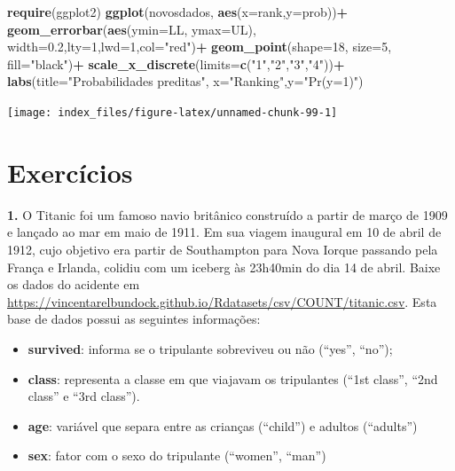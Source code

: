 \documentclass[12pt,brazil,oneside]{book}
\newenvironment{Shaded}{\begin{snugshade}}{\end{snugshade}}
\newcommand{\DataTypeTok}[1]{\textcolor[rgb]{0.13,0.29,0.53}{#1}}
\newcommand{\DecValTok}[1]{\textcolor[rgb]{0.00,0.00,0.81}{#1}}
\newcommand{\FloatTok}[1]{\textcolor[rgb]{0.00,0.00,0.81}{#1}}
\newcommand{\KeywordTok}[1]{\textcolor[rgb]{0.13,0.29,0.53}{\textbf{#1}}}
\newcommand{\NormalTok}[1]{#1}
\newcommand{\OperatorTok}[1]{\textcolor[rgb]{0.81,0.36,0.00}{\textbf{#1}}}
\newcommand{\StringTok}[1]{\textcolor[rgb]{0.31,0.60,0.02}{#1}}
\providecommand{\tightlist}{%
  \setlength{\itemsep}{0pt}\setlength{\parskip}{0pt}}
\begin{document}
\begin{Shaded}
\begin{Highlighting}[]
\KeywordTok{require}\NormalTok{(ggplot2)}
\KeywordTok{ggplot}\NormalTok{(novosdados, }\KeywordTok{aes}\NormalTok{(}\DataTypeTok{x=}\NormalTok{rank,}\DataTypeTok{y=}\NormalTok{prob))}\OperatorTok{+}
\StringTok{  }\KeywordTok{geom_errorbar}\NormalTok{(}\KeywordTok{aes}\NormalTok{(}\DataTypeTok{ymin=}\NormalTok{LL, }\DataTypeTok{ymax=}\NormalTok{UL), }\DataTypeTok{width=}\FloatTok{0.2}\NormalTok{,}\DataTypeTok{lty=}\DecValTok{1}\NormalTok{,}\DataTypeTok{lwd=}\DecValTok{1}\NormalTok{,}\DataTypeTok{col=}\StringTok{"red"}\NormalTok{)}\OperatorTok{+}
\StringTok{  }\KeywordTok{geom_point}\NormalTok{(}\DataTypeTok{shape=}\DecValTok{18}\NormalTok{, }\DataTypeTok{size=}\DecValTok{5}\NormalTok{, }\DataTypeTok{fill=}\StringTok{"black"}\NormalTok{)}\OperatorTok{+}
\StringTok{  }\KeywordTok{scale_x_discrete}\NormalTok{(}\DataTypeTok{limits=}\KeywordTok{c}\NormalTok{(}\StringTok{"1"}\NormalTok{,}\StringTok{"2"}\NormalTok{,}\StringTok{"3"}\NormalTok{,}\StringTok{"4"}\NormalTok{))}\OperatorTok{+}
\StringTok{  }\KeywordTok{labs}\NormalTok{(}\DataTypeTok{title=}\StringTok{"Probabilidades preditas"}\NormalTok{, }\DataTypeTok{x=}\StringTok{"Ranking"}\NormalTok{,}\DataTypeTok{y=}\StringTok{"Pr(y=1)"}\NormalTok{)}
\end{Highlighting}
\end{Shaded}

\begin{center}\texttt{[image: index\_files/figure-latex/unnamed-chunk-99-1]} \end{center}

\hypertarget{exercicios}{%
\section{Exercícios}\label{exercicios}}

\textbf{1.} O Titanic foi um famoso navio britânico construído a partir de março de 1909 e lançado ao mar em maio de 1911. Em sua viagem inaugural em 10 de abril de 1912, cujo objetivo era partir de Southampton para Nova Iorque passando pela França e Irlanda, colidiu com um iceberg às 23h40min do dia 14 de abril. Baixe os dados do acidente em
\url{https://vincentarelbundock.github.io/Rdatasets/csv/COUNT/titanic.csv}. Esta base de dados possui as seguintes informações:

\begin{itemize}
\tightlist
\item
  \textbf{survived}: informa se o tripulante sobreviveu ou não (``yes'', ``no'');
\item
  \textbf{class}: representa a classe em que viajavam os tripulantes (``1st class'', ``2nd class'' e ``3rd class'').
\item
  \textbf{age}: variável que separa entre as crianças (``child'') e adultos (``adults'')
\item
  \textbf{sex}: fator com o sexo do tripulante (``women'', ``man'')
\end{itemize}
\end{document}
